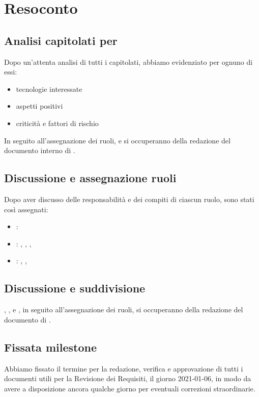 \section{Resoconto}

\subsection{Analisi capitolati per \SdF{}}
Dopo un'attenta analisi di tutti i capitolati, abbiamo evidenziato per ognuno di essi:
	\begin{itemize}
		\item tecnologie interessate
		\item aspetti positivi
		\item criticità e fattori di rischio
	\end{itemize}
In seguito all'assegnazione dei ruoli, \GB{} e \MDI{} si occuperanno della redazione del documento interno di \SdF{} .

\subsection{Discussione e assegnazione ruoli}
Dopo aver discusso delle responsabilità e dei compiti di ciascun ruolo, sono stati così assegnati:
	\begin{itemize}
		\item \respProg{} : \MB
		\item \ammProg{} : \SB , \FD , \NM , \VAS
		\item \analProg{} : \GB , \MDI , \MB
	\end{itemize}

\subsection{Discussione e suddivisione \NdP{}}
\SB , \FD , \NM{} e \VAS{}, in seguito all'assegnazione dei ruoli, si occuperanno della redazione del documento di \NdP{} .

\subsection{Fissata milestone}
Abbiamo fissato il termine per la redazione, verifica e approvazione di tutti i documenti utili per la Revisione dei Requisiti, il giorno 2021-01-06, in modo da avere a disposizione ancora qualche giorno per eventuali correzioni straordinarie.